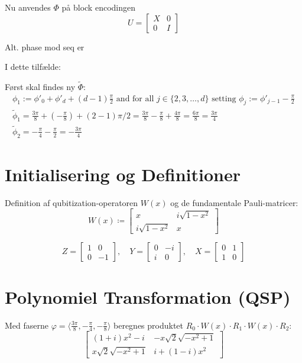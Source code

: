 \documentclass[11pt,a4paper]{article}
\begin{document}
\newpage

Nu anvendes $\Phi$ på block encodingen
\[ U = \begin{bmatrix} X & 0 \\ 0 & I \end{bmatrix} \]

Alt. phase mod seq er
\

I dette tilfælde:
\

Først skal findes ny $\tilde{\Phi}$:
\begin{gather*}
    \phi_1 := \phi'_0 + \phi'_d + (d-1)\frac{\pi}{2} \text{ and for all } j \in \{2, 3, \dots, d\} \text{ setting } \phi_j := \phi'_{j-1} - \frac{\pi}{2} \\
    \tilde{\phi}_1 = \frac{3\pi}{8} + \left( -\frac{\pi}{8} \right) + (2-1)\pi/2 = \frac{3\pi}{8} - \frac{\pi}{8} + \frac{4\pi}{8} = \frac{6\pi}{8} = \frac{3\pi}{4} \\
    \tilde{\phi}_2 = -\frac{\pi}{4} - \frac{\pi}{2} = -\frac{3\pi}{4}
\end{gather*}




\section{Initialisering og Definitioner}
Definition af qubitization-operatoren $W(x)$ og de fundamentale Pauli-matricer:
\begin{equation}
W(x) \coloneqq \begin{bmatrix} x & i\sqrt{1-x^2} \\ i\sqrt{1-x^2} & x \end{bmatrix}
\end{equation}

\begin{equation}
Z = \begin{bmatrix} 1 & 0 \\ 0 & -1 \end{bmatrix}, \quad 
Y = \begin{bmatrix} 0 & -i \\ i & 0 \end{bmatrix}, \quad 
X = \begin{bmatrix} 0 & 1 \\ 1 & 0 \end{bmatrix}
\end{equation}

\section{Polynomiel Transformation (QSP)}
Med faserne $\varphi = \langle \frac{3\pi}{8}, -\frac{\pi}{4}, -\frac{\pi}{8} \rangle$ beregnes produktet $R_0 \cdot W(x) \cdot R_1 \cdot W(x) \cdot R_2$:
\begin{equation}
\begin{bmatrix}
(1+i)x^2 - i & -x\sqrt{2}\sqrt{-x^2+1} \\
x\sqrt{2}\sqrt{-x^2+1} & i + (1-i)x^2
\end{bmatrix}
\end{equation}
\end{document}
